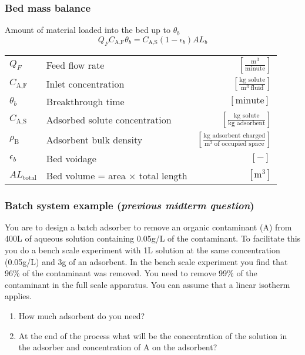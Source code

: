 \begin{frame}\frametitle{Bed mass balance}
	
	\begin{exampleblock}{Amount of material loaded into the bed up to $\theta_b$}
		\[Q_F C_\text{A,F} \theta_b = C_\text{A,S} \left(1-\epsilon_b \right) A L_b \]
	\end{exampleblock}

	\begin{tabular}{llr}\vspace{6pt}
		$Q_F $					& Feed flow rate					& $\left[ \displaystyle\frac{\text{m}^3}{\text{minute}}\right]$ \\ 	\vspace{6pt}
		$C_\text{A,F} $			& Inlet concentration				& $\left[ \displaystyle\frac{\text{kg solute}}{\text{m}^3~\text{fluid}}\right]$ \\ 	\vspace{6pt}
		$\theta_b$				& Breakthrough time					& $\left[ \text{minute}\right]\,$ \\ 	\vspace{6pt}
		$C_\text{A,S}$			& Adsorbed solute concentration		& $\left[ \displaystyle\frac{\text{kg solute}}{\text{kg adsorbent}}\right]$ \\ \vspace{6pt}		
		$\rho_\text{B}$			& Adsorbent bulk density			& $\left[ \displaystyle\frac{\text{kg adsorbent charged}}{\text{m}^3~\text{of occupied space}}\right]$ \\ 	\vspace{6pt}	
		$\epsilon_b$			& Bed voidage						& $\left[ - \right]\,$ \\  		
		$A L_\text{total}$		& Bed volume = area $\times$ total length	& $\left[ \text{m}^3\right]$
	\end{tabular}
	
	\vspace{6pt}
	{\color{myBlue}{Use these to determine mass of adsorbent required.}}
\end{frame}

\begin{frame}\frametitle{Batch system example (\emph{previous midterm question})}
	You are to design a batch adsorber to remove an organic contaminant (A) from 400L of aqueous solution containing 0.05g/L of the contaminant. To facilitate this you do a bench scale experiment with 1L solution at the same concentration (0.05g/L) and 3g of an adsorbent. In the bench scale experiment you find that 96\% of the contaminant was removed. You need to remove 99\% of the contaminant in the full scale apparatus. You can assume that a linear isotherm applies.
	
	\begin{enumerate}
		\item	How much adsorbent do you need? 
		\item	At the end of the process what will be the concentration of the solution in the adsorber and concentration of A on the adsorbent? 
	\end{enumerate}
\end{frame}

